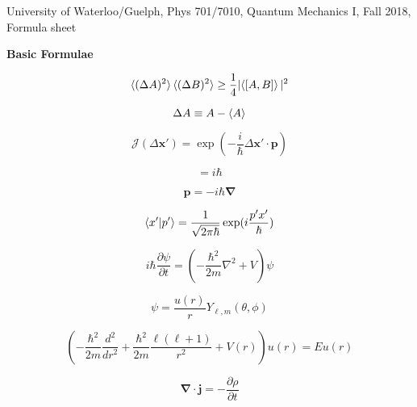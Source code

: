 \documentclass[11pt]{article}
\newcommand{\CurJ}{\mathcal{J}}
\newcommand{\vect}[1]{\boldsymbol{\mathbf{#1}}}
\begin{document}
\begin{center} 
{\large University of Waterloo/Guelph, Phys 701/7010, Quantum Mechanics I, Fall 2018, Formula sheet}
\end{center}

\begin{multicols}{2}

{\bf Basic Formulae}

\begin{equation} %
\braket{(\Delta A)^2} \braket{(\Delta B)^2} 
  \ge \frac{1}{4} |\!\braket{[A,B]}|^2
\end{equation}

\begin{equation}
\Delta A \equiv A - \braket{A}
\end{equation}

\begin{equation}
\CurJ (\Delta \vect{x}') = \exp \left (-\frac{i}{\hbar} \Delta \vect{x}' \cdot \vect{p} \right)
\end{equation}

\begin{equation}
[\,x,p\,] = i\hbar
\end{equation}

\begin{equation}
\vect{p} = -i \hbar \vect{\nabla}
\end{equation}

\begin{equation}
\braket{x'|p'} = \frac{1}{\sqrt{2\pi\hbar}} \exp (i\frac{p'x'}{\hbar})
\end{equation}

\begin{equation}
i\hbar \frac{\partial \psi}{\partial t} = (-\frac{\hbar^2}{2m} \nabla^2 + V) \psi
\end{equation}

\begin{equation}
\psi = \frac{u(r)}{r} Y_{\ell,m}(\theta,\phi)
\end{equation}

\begin{equation}
\left(
  -\frac{\hbar^2}{2m} \frac{d^2}{d r^2}
  + \frac{\hbar^2}{2m} \frac{\ell (\ell+1)}{r^2}
  + V(r)
\right) u(r) = E u(r)
\end{equation}

\begin{equation}
\vect{\nabla} \cdot \vect{j} = - \frac{\partial \rho}{\partial t}
\end{equation}


\end{multicols}
\end{document}
